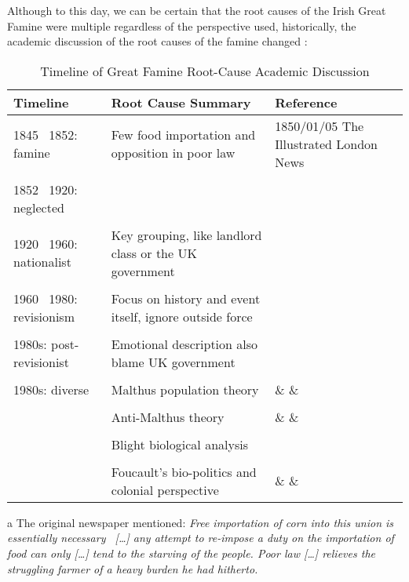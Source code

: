 Although to this day, we can be certain that the root causes of the Irish Great Famine were multiple regardless of the perspective used, historically, the academic discussion of the root causes of the famine changed \citep{henderson2005irish}:

\vspace{0pt}
\begin{table}[h]
    \centering
	\begin{threeparttable}
    \caption{Timeline of Great Famine Root-Cause Academic Discussion}
		\begin{tabular}{lp{5cm}p{5cm}}
			\toprule
			Timeline & Root Cause Summary & Reference \\
			\midrule
			1845 \textendash\ 1852: famine & Few food importation and opposition in poor law & 1850/01/05 The Illustrated London News\tnote{a} \\
			& & \\
			1852 \textendash\ 1920: neglected  & \textemdash\ \tnote{b} & \citep{kinealy2017great}\\
			& & \\
			1920 \textendash\ 1960: nationalist & Key grouping, like landlord class or the UK government & \citep{smith2005reckoning} \\
			& & \\
			1960 \textendash\ 1980: revisionism & Focus on history and event itself, ignore outside force & \citep{daly2006revisionism} \\
			& & \\
			1980s: post-revisionist & Emotional description also blame UK government & \citep{hamera2011outline} \\
			& & \\
			1980s: diverse & Malthus population theory & \citep{o2009food} \& \citep{mcgregor1989demographic} \& \citep{weir1991malthus} \\
			& &  \\
			& Anti-Malthus theory & \citep{o1983malthus} \& \citep{mokyr1980malthusian} \& \citep{guinnane1994great}\\
			& & \\
			& Blight biological analysis & \citep{donnelly2011irish}\\
			& & \\
			& Foucault's bio-politics and colonial perspective & \citep{nally2008coming} \& \citep{kennedy2020beckett} \& \citep{madden2016aids} \\
			\bottomrule
		\end{tabular}
		\begin{tablenotes}
			\item[a] The original newspaper mentioned: \textit{Free importation of corn into this union is essentially necessary \textendash\ [\ldots] any attempt to re-impose a duty on the importation of food can only [\ldots]  tend to the starving of the people. Poor law [\ldots] relieves the struggling farmer of a heavy burden he had hitherto.} \citep{1850_01_05_news}
			

\end{tablenotes}
\end{threeparttable}
\end{table}

